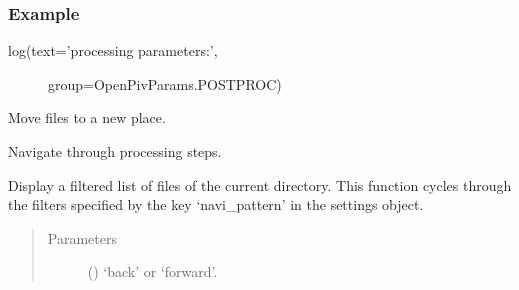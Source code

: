\documentclass[letterpaper,10pt,english]{sphinxmanual}
\begin{document}
\begin{fulllineitems}
\begin{fulllineitems}
\begin{quote}
\begin{description}
\begin{itemize}
\end{itemize}

\end{description}\end{quote}
\subsubsection*{Example}
\begin{description}
\item[{log(text=’processing parameters:’,}] \leavevmode
group=OpenPivParams.POSTPROC)

\end{description}

\end{fulllineitems}


\begin{fulllineitems}
\label{\detokenize{openpivgui:openpivgui.OpenPivGui.OpenPivGui.move_files}}
Move files to a new place.

\end{fulllineitems}


\begin{fulllineitems}
\label{\detokenize{openpivgui:openpivgui.OpenPivGui.OpenPivGui.navigate}}
Navigate through processing steps.

Display a filtered list of files of the current
directory. This function cycles through the filters
specified by the key ‘navi\_pattern’ in the settings object.
\begin{quote}\begin{description}
\item[{Parameters}] \leavevmode
{} () \textendash{} ‘back’ or ‘forward’.

\end{description}\end{quote}

\end{fulllineitems}


\end{fulllineitems}
\end{document}
